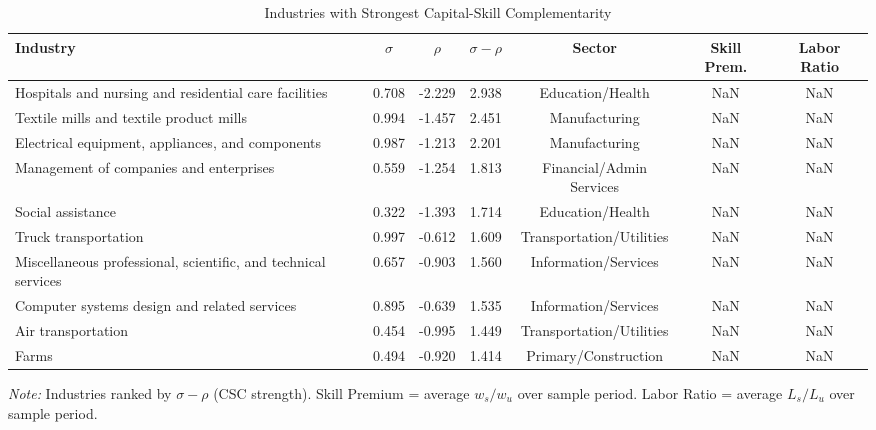 \begin{table}[H]
\caption{Industries with Strongest Capital-Skill Complementarity}
\label{tab:strongest_csc}
\begin{center}
\small
\begin{tabular}{lcccccc}
\toprule
Industry & $\sigma$ & $\rho$ & $\sigma-\rho$ & Sector & Skill Prem. & Labor Ratio \\
\midrule
Hospitals and nursing and residential care facilities & 0.708 & -2.229 & 2.938 & Education/Health & NaN & NaN \\
Textile mills and textile product mills & 0.994 & -1.457 & 2.451 & Manufacturing & NaN & NaN \\
Electrical equipment, appliances, and components & 0.987 & -1.213 & 2.201 & Manufacturing & NaN & NaN \\
Management of companies and enterprises & 0.559 & -1.254 & 1.813 & Financial/Admin Services & NaN & NaN \\
Social assistance & 0.322 & -1.393 & 1.714 & Education/Health & NaN & NaN \\
Truck transportation & 0.997 & -0.612 & 1.609 & Transportation/Utilities & NaN & NaN \\
Miscellaneous professional, scientific, and technical services & 0.657 & -0.903 & 1.560 & Information/Services & NaN & NaN \\
Computer systems design and related services & 0.895 & -0.639 & 1.535 & Information/Services & NaN & NaN \\
Air transportation & 0.454 & -0.995 & 1.449 & Transportation/Utilities & NaN & NaN \\
Farms & 0.494 & -0.920 & 1.414 & Primary/Construction & NaN & NaN \\
\bottomrule
\end{tabular}
\end{center}
\begin{minipage}{\textwidth}
\small
\textit{Note:} Industries ranked by $\sigma - \rho$ (CSC strength). Skill Premium = average $w_s/w_u$ over sample period. Labor Ratio = average $L_s/L_u$ over sample period.
\end{minipage}
\end{table}
